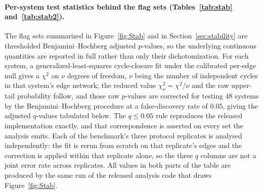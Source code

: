 \paragraph{Per-system test statistics behind the flag sets (Tables~\ref{tab:stab}
and~\ref{tab:stab2}).} The flag sets summarized in Figure~\ref{fig:Stab} and in
Section~\ref{sec:stability} are thresholded Benjamini--Hochberg adjusted $p$-values, so the
underlying continuous quantities are reported in full rather than only their dichotomization.
For each system, a generalized-least-squares cycle-closure fit under the calibrated per-edge
null gives a $\chi^2$ on $\nu$ degrees of freedom, $\nu$ being the number of independent cycles
in that system's edge network; the reduced value $\chi^2_\nu=\chi^2/\nu$ and the raw upper-tail
probability follow, and those raw $p$-values are corrected for testing $48$ systems by the
Benjamini--Hochberg procedure at a false-discovery rate of $0.05$, giving the adjusted
$q$-values tabulated below. The $q\le0.05$ rule reproduces the released implementation exactly, and that correspondence is asserted on every set the analysis emits.
Each of the benchmark's three protocol replicates is analysed independently: the fit is rerun
from scratch on that replicate's edges and the correction is applied within that replicate
alone, so the three $q$ columns are not a joint error rate across replicates. All values in both
parts of the table are produced by the same run of the released analysis code that draws
Figure~\ref{fig:Stab}.

